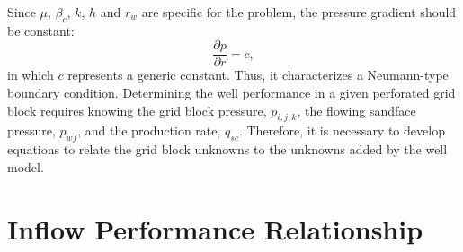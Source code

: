 %
Since $\mu$, $\beta_c$, $k$, $h$ and $r_w$ are specific for the problem, the pressure gradient should be constant:
%
\begin{equation}
	\frac{\partial p}{\partial r}=c,
\end{equation}
%
in which $c$ represents a generic constant.
%
Thus, it characterizes a Neumann-type boundary condition.
%
Determining the well performance in a given perforated grid block requires knowing the grid block pressure, $p_{i,j,k}$, the flowing sandface pressure, $p_{wf}$, and the production rate, $q_{sc}$.
%
Therefore, it is necessary to develop equations to relate the grid block unknowns to the unknowns added by the well model.

\section{Inflow Performance Relationship}

